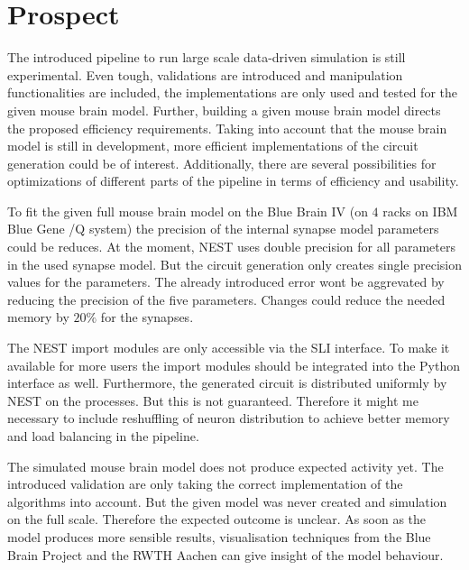 \section{Prospect}
The introduced pipeline to run large scale data-driven simulation is still experimental.
Even tough, validations are introduced and manipulation functionalities are included, the 
implementations are only used and tested for the given mouse brain model. Further, building a given 
mouse brain model directs the proposed efficiency requirements. Taking into account that
the mouse brain model is still in development, more efficient implementations of the 
circuit generation could be of interest.
Additionally, there are several possibilities for optimizations of different parts of the pipeline in terms of efficiency and usability.

To fit the given full mouse brain model on the Blue Brain IV (on $4$ racks on IBM Blue Gene /Q system) the precision of  the internal synapse model parameters could be reduces.
At the moment, NEST uses double precision
for all parameters in the used synapse model.
But the circuit generation only creates single precision values for the parameters.
The already introduced error wont be aggrevated
by reducing the precision of the five parameters.
Changes could reduce the needed memory by $20\%$ for the synapses.

The NEST import modules are only accessible via the SLI interface\cite{SLI}.
To make it available for more users the import modules should be integrated into the Python
interface as well. Furthermore, the generated circuit is distributed uniformly by NEST on the processes. But this is not guaranteed. Therefore it might me necessary to include reshuffling of neuron distribution to achieve better memory and load balancing in the pipeline.

The simulated mouse brain model does not produce expected activity yet.
The introduced validation are only taking the correct implementation of the algorithms into account.
But the given model was never created and simulation on the full scale. Therefore the expected outcome is unclear. As soon as the model produces more sensible results, visualisation techniques from the
Blue Brain Project and the RWTH Aachen can give insight of the model behaviour.